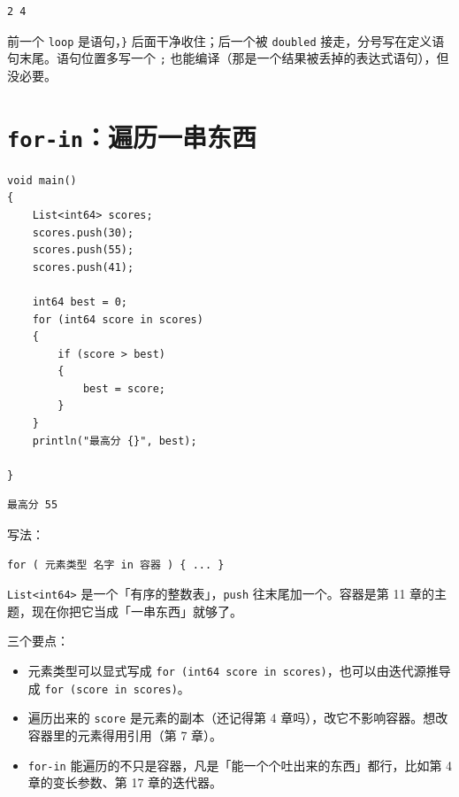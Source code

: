 \par
\medskip
\begin{lstlisting}[style=out]
2 4
\end{lstlisting}
\par
\medskip

前一个 \texttt{loop} 是语句，\texttt{\}} 后面干净收住；后一个被 \texttt{doubled} 接走，分号写在定义语句末尾。语句位置多写一个 \texttt{;} 也能编译（那是一个结果被丢掉的表达式语句），但没必要。

\section{\texttt{for-in}：遍历一串东西}

\par
\medskip
\begin{lstlisting}[style=chali]
void main()
{
    List<int64> scores;
    scores.push(30);
    scores.push(55);
    scores.push(41);

    int64 best = 0;
    for (int64 score in scores)
    {
        if (score > best)
        {
            best = score;
        }
    }
    println("最高分 {}", best);

}
\end{lstlisting}
\par
\medskip

\par
\medskip
\begin{lstlisting}[style=out]
最高分 55
\end{lstlisting}
\par
\medskip

写法：

\par
\medskip
\begin{lstlisting}[style=out]
for ( 元素类型 名字 in 容器 ) { ... }
\end{lstlisting}
\par
\medskip

\texttt{List<\allowbreak{}int64>\allowbreak{}} 是一个「有序的整数表」，\texttt{push} 往末尾加一个。容器是第 11 章的主题，现在你把它当成「一串东西」就够了。

三个要点：

\begin{itemize}

\item 元素类型可以显式写成 \texttt{for (\allowbreak{}int64 score in scores)\allowbreak{}}，也可以由迭代源推导成 \texttt{for (\allowbreak{}score in scores)\allowbreak{}}。

\item 遍历出来的 \texttt{score} 是元素的副本（还记得第 4 章吗），改它不影响容器。想改容器里的元素得用引用（第 7 章）。

\item \texttt{for-in} 能遍历的不只是容器，凡是「能一个个吐出来的东西」都行，比如第 4 章的变长参数、第 17 章的迭代器。

\end{itemize}

